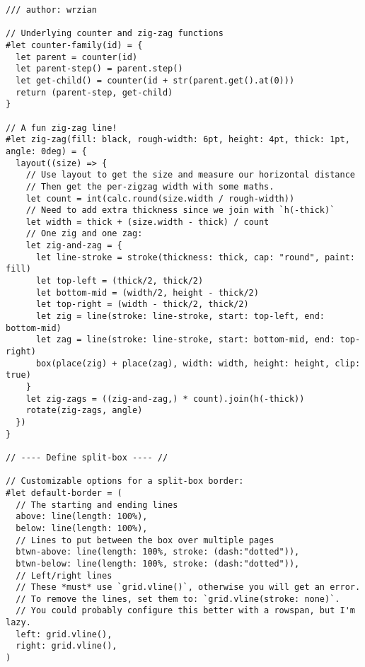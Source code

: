 \begin{verbatim}
/// author: wrzian

// Underlying counter and zig-zag functions
#let counter-family(id) = {
  let parent = counter(id)
  let parent-step() = parent.step()
  let get-child() = counter(id + str(parent.get().at(0)))
  return (parent-step, get-child)
}

// A fun zig-zag line!
#let zig-zag(fill: black, rough-width: 6pt, height: 4pt, thick: 1pt, angle: 0deg) = {
  layout((size) => {
    // Use layout to get the size and measure our horizontal distance
    // Then get the per-zigzag width with some maths.
    let count = int(calc.round(size.width / rough-width))
    // Need to add extra thickness since we join with `h(-thick)`
    let width = thick + (size.width - thick) / count
    // One zig and one zag:
    let zig-and-zag = {
      let line-stroke = stroke(thickness: thick, cap: "round", paint: fill)
      let top-left = (thick/2, thick/2)
      let bottom-mid = (width/2, height - thick/2)
      let top-right = (width - thick/2, thick/2)
      let zig = line(stroke: line-stroke, start: top-left, end: bottom-mid)
      let zag = line(stroke: line-stroke, start: bottom-mid, end: top-right)
      box(place(zig) + place(zag), width: width, height: height, clip: true)
    }
    let zig-zags = ((zig-and-zag,) * count).join(h(-thick))
    rotate(zig-zags, angle)
  })
}

// ---- Define split-box ---- //

// Customizable options for a split-box border:
#let default-border = (
  // The starting and ending lines
  above: line(length: 100%),
  below: line(length: 100%),
  // Lines to put between the box over multiple pages
  btwn-above: line(length: 100%, stroke: (dash:"dotted")),
  btwn-below: line(length: 100%, stroke: (dash:"dotted")),
  // Left/right lines
  // These *must* use `grid.vline()`, otherwise you will get an error.
  // To remove the lines, set them to: `grid.vline(stroke: none)`.
  // You could probably configure this better with a rowspan, but I'm lazy.
  left: grid.vline(),
  right: grid.vline(),
)


\end{verbatim}
